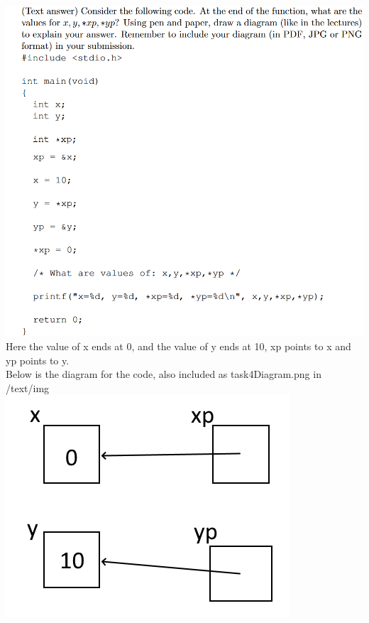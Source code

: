\documentclass{article}
\begin{document}
\section{}
\includegraphics[width=\linewidth, keepaspectratio=true]{task4}
\vspace{2pt}\\
Here the value of x ends at 0, and the value of y ends at 10, xp points to x and yp points to y.\\
Below is the diagram for the code, also included as task4Diagram.png in /text/img\\
\includegraphics[scale=0.7, keepaspectratio=true]{task4Diagram}
\end{document}
